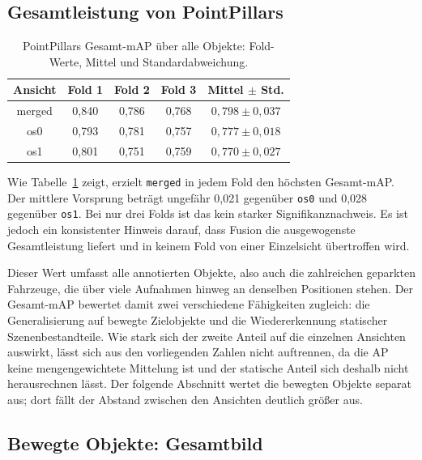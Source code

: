 \subsection{Gesamtleistung von PointPillars}
\label{sec:gesamtleistung}

\begin{table}[H]
\centering
\begin{tabular}{ccccc}
\toprule
\textbf{Ansicht} & \textbf{Fold 1} & \textbf{Fold 2} & \textbf{Fold 3} & \textbf{Mittel \(\pm\) Std.} \\
\midrule
merged & 0{,}840 & 0{,}786 & 0{,}768 & \(0{,}798 \pm 0{,}037\) \\
os0    & 0{,}793 & 0{,}781 & 0{,}757 & \(0{,}777 \pm 0{,}018\) \\
os1    & 0{,}801 & 0{,}751 & 0{,}759 & \(0{,}770 \pm 0{,}027\) \\
\bottomrule
\end{tabular}
\caption{PointPillars Gesamt-mAP über alle Objekte: Fold-Werte, Mittel und Standardabweichung.}
\label{tab:pp-mAP-overall}
\end{table}

Wie Tabelle~\ref{tab:pp-mAP-overall} zeigt, erzielt \texttt{merged} in jedem Fold den höchsten Gesamt-mAP. Der mittlere Vorsprung beträgt ungefähr 0{,}021 gegenüber \texttt{os0} und 0{,}028 gegenüber \texttt{os1}. Bei nur drei Folds ist das kein starker Signifikanznachweis. Es ist jedoch ein konsistenter Hinweis darauf, dass Fusion die ausgewogenste Gesamtleistung liefert und in keinem Fold von einer Einzelsicht übertroffen wird.

Dieser Wert umfasst alle annotierten Objekte, also auch die zahlreichen geparkten Fahrzeuge, die über viele Aufnahmen hinweg an denselben Positionen stehen. Der Gesamt-mAP bewertet damit zwei verschiedene Fähigkeiten zugleich: die Generalisierung auf bewegte Zielobjekte und die Wiedererkennung statischer Szenenbestandteile. Wie stark sich der zweite Anteil auf die einzelnen Ansichten auswirkt, lässt sich aus den vorliegenden Zahlen nicht auftrennen, da die AP keine mengengewichtete Mittelung ist und der statische Anteil sich deshalb nicht herausrechnen lässt. Der folgende Abschnitt wertet die bewegten Objekte separat aus; dort fällt der Abstand zwischen den Ansichten deutlich größer aus.

\subsection{Bewegte Objekte: Gesamtbild}
\label{sec:bewegte-gesamt}

